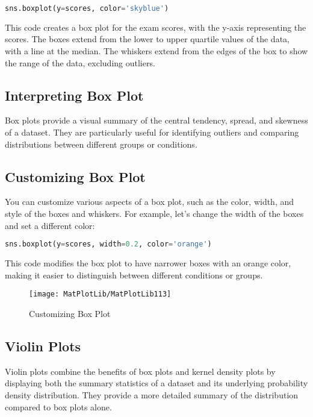 \begin{lstlisting}[language=Python, caption={Generating a Box Plot}]
	sns.boxplot(y=scores, color='skyblue')
\end{lstlisting}

This code creates a box plot for the exam scores, with the y-axis representing the scores. The boxes extend from the lower to upper quartile values of the data, with a line at the median. The whiskers extend from the edges of the box to show the range of the data, excluding outliers.

\subsection*{Interpreting Box Plot}

Box plots provide a visual summary of the central tendency, spread, and skewness of a dataset. They are particularly useful for identifying outliers and comparing distributions between different groups or conditions.

\subsection*{Customizing Box Plot}

You can customize various aspects of a box plot, such as the color, width, and style of the boxes and whiskers. For example, let's change the width of the boxes and set a different color:

\begin{lstlisting}[language=Python, caption={Customizing Box Plot}]
	sns.boxplot(y=scores, width=0.2, color='orange')
\end{lstlisting}

This code modifies the box plot to have narrower boxes with an orange color, making it easier to distinguish between different conditions or groups.

\begin{figure}[h]
	\centering
	\texttt{[image: MatPlotLib/MatPlotLib113]}
	\caption{Customizing Box Plot}\label{Matplotlib113}
\end{figure}

\subsection{Violin Plots}

Violin plots combine the benefits of box plots and kernel density plots by displaying both the summary statistics of a dataset and its underlying probability density distribution. They provide a more detailed summary of the distribution compared to box plots alone.

